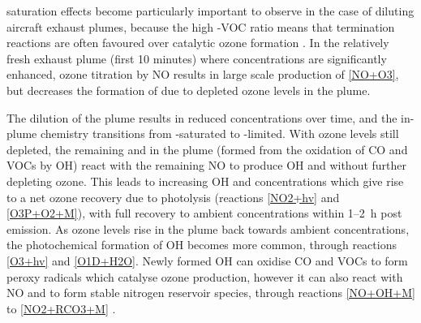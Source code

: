 
 saturation effects become particularly important to observe in the case of diluting aircraft exhaust plumes, because the high -VOC ratio means that termination reactions are often favoured over catalytic ozone formation \cite{Song2003}. In the relatively fresh exhaust plume (first 10 minutes) where  concentrations are significantly enhanced, ozone titration by NO results in large scale production of  \eqref{NO+O3}, but decreases the formation of  due to depleted ozone levels in the plume.


The dilution of the plume results in reduced  concentrations over time, and the in-plume chemistry transitions from -saturated to -limited. With ozone levels still depleted, the remaining  and  in the plume (formed from the oxidation of CO and VOCs by OH) react with the remaining NO to produce OH and  without further depleting ozone. This leads to increasing OH and  concentrations which give rise to a net ozone recovery due to  photolysis (reactions \eqref{NO2+hv} and \eqref{O3P+O2+M}), with full recovery to ambient concentrations within 1--2~h post emission. As ozone levels rise in the plume back towards ambient concentrations, the photochemical formation of OH becomes more common, through reactions \eqref{O3+hv} and \eqref{O1D+H2O}. Newly formed OH can oxidise CO and VOCs to form peroxy radicals which catalyse ozone production, however it can also react with NO and  to form stable nitrogen reservoir species, through reactions \eqref{NO+OH+M} to \eqref{NO2+RCO3+M} \cite{Fritz2020}.

